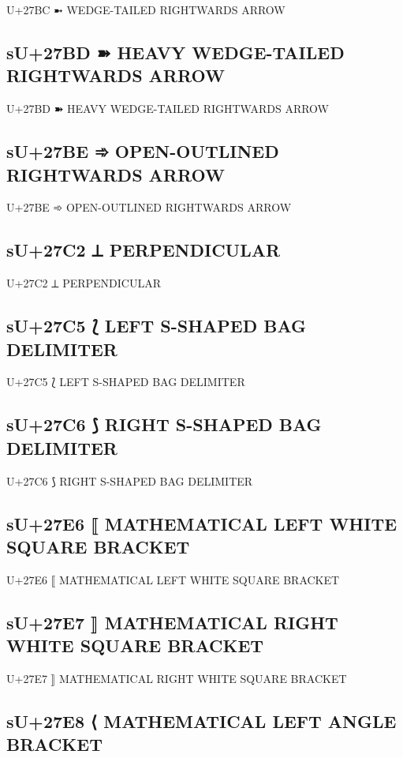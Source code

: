 U+27BC ➼ WEDGE-TAILED RIGHTWARDS ARROW

\subsection{sU+27BD ➽ HEAVY WEDGE-TAILED RIGHTWARDS ARROW}

U+27BD ➽ HEAVY WEDGE-TAILED RIGHTWARDS ARROW

\subsection{sU+27BE ➾ OPEN-OUTLINED RIGHTWARDS ARROW}

U+27BE ➾ OPEN-OUTLINED RIGHTWARDS ARROW

\subsection{sU+27C2 ⟂ PERPENDICULAR}

U+27C2 ⟂ PERPENDICULAR

\subsection{sU+27C5 ⟅ LEFT S-SHAPED BAG DELIMITER}

U+27C5 ⟅ LEFT S-SHAPED BAG DELIMITER

\subsection{sU+27C6 ⟆ RIGHT S-SHAPED BAG DELIMITER}

U+27C6 ⟆ RIGHT S-SHAPED BAG DELIMITER

\subsection{sU+27E6 ⟦ MATHEMATICAL LEFT WHITE SQUARE BRACKET}

U+27E6 ⟦ MATHEMATICAL LEFT WHITE SQUARE BRACKET

\subsection{sU+27E7 ⟧ MATHEMATICAL RIGHT WHITE SQUARE BRACKET}

U+27E7 ⟧ MATHEMATICAL RIGHT WHITE SQUARE BRACKET

\subsection{sU+27E8 ⟨ MATHEMATICAL LEFT ANGLE BRACKET}

